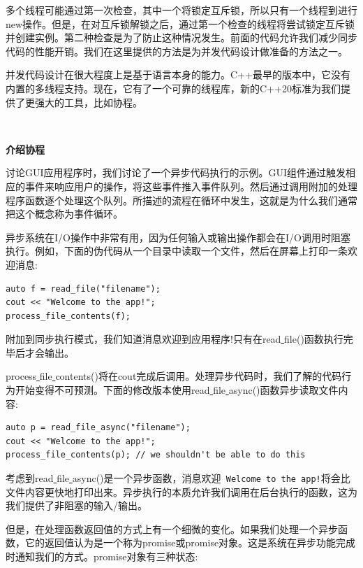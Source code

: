 多个线程可能通过第一次检查，其中一个将锁定互斥锁，所以只有一个线程到进行new操作。但是，在对互斥锁解锁之后，通过第一个检查的线程将尝试锁定互斥锁并创建实例。第二种检查是为了防止这种情况发生。前面的代码允许我们减少同步代码的性能开销。我们在这里提供的方法是为并发代码设计做准备的方法之一。 \par
并发代码设计在很大程度上是基于语言本身的能力。C++最早的版本中，它没有内置的多线程支持。现在，它有了一个可靠的线程库，新的C++20标准为我们提供了更强大的工具，比如协程。 \par

\noindent\textbf{}\ \par
\textbf{介绍协程} \ \par
讨论GUI应用程序时，我们讨论了一个异步代码执行的示例。GUI组件通过触发相应的事件来响应用户的操作，将这些事件推入事件队列。然后通过调用附加的处理程序函数逐个处理这个队列。所描述的流程在循环中发生，这就是为什么我们通常把这个概念称为事件循环。 \par
异步系统在I/O操作中非常有用，因为任何输入或输出操作都会在I/O调用时阻塞执行。例如，下面的伪代码从一个目录中读取一个文件，然后在屏幕上打印一条欢迎消息: \par

\begin{lstlisting}[caption={}]
auto f = read_file("filename");
cout << "Welcome to the app!";
process_file_contents(f);
\end{lstlisting}

附加到同步执行模式，我们知道消息欢迎到应用程序!只有在read\underline{ }file()函数执行完毕后才会输出。 \par
process\underline{ }file\underline{ }contents()将在cout完成后调用。处理异步代码时，我们了解的代码行为开始变得不可预测。下面的修改版本使用read\underline{ }file\underline{ }async()函数异步读取文件内容: \par

\begin{lstlisting}[caption={}]
auto p = read_file_async("filename");
cout << "Welcome to the app!";
process_file_contents(p); // we shouldn't be able to do this
\end{lstlisting}

考虑到read\underline{ }file\underline{ }async()是一个异步函数，消息欢迎\texttt{ Welcome to the app!}将会比文件内容更快地打印出来。异步执行的本质允许我们调用在后台执行的函数，这为我们提供了非阻塞的输入/输出。 \par
但是，在处理函数返回值的方式上有一个细微的变化。如果我们处理一个异步函数，它的返回值认为是一个称为promise或promise对象。这是系统在异步功能完成时通知我们的方式。promise对象有三种状态: \par

